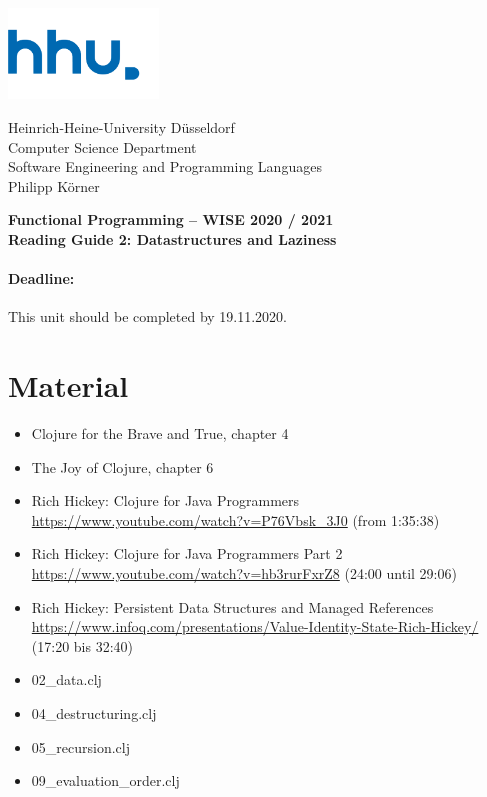 \documentclass[11pt,a4paper]{article}
\begin{document}
	
	\begin{minipage}[b]{\textwidth}
		\parbox[t]{5cm}{%
			\includegraphics[width=4cm]{unilogo}
			\hfill
		}
		\parbox[b]{11cm}{%
			Heinrich-Heine-University D\"usseldorf\\
			Computer Science Department\\
			Software Engineering and Programming Languages\\
			Philipp K\"orner
		}
	\end{minipage}
\begin{center}
	\bf
	Functional Programming -- WISE 2020 / 2021\\
	Reading Guide 2: Datastructures and Laziness
\end{center}

\pagestyle{empty}

\paragraph{Deadline:} This unit should be completed by 19.11.2020.

\section{Material} 

\begin{itemize}
\item Clojure for the Brave and True, chapter 4
\item The Joy of Clojure, chapter 6
\item Rich Hickey: Clojure for Java Programmers \url{https://www.youtube.com/watch?v=P76Vbsk_3J0} (from 1:35:38)
\item Rich Hickey: Clojure for Java Programmers Part 2 \url{https://www.youtube.com/watch?v=hb3rurFxrZ8} (24:00 until 29:06)
\item Rich Hickey: Persistent Data Structures and Managed References \url{https://www.infoq.com/presentations/Value-Identity-State-Rich-Hickey/} (17:20 bis 32:40)
\item 02\_data.clj
\item 04\_destructuring.clj
\item 05\_recursion.clj 
\item 09\_evaluation\_order.clj
\end{itemize}
\end{document}

